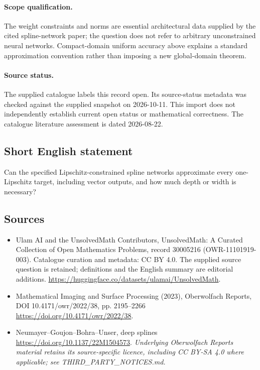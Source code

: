 \documentclass[11pt]{article}
\begin{document}
\paragraph{Scope qualification.}
The weight constraints and norms are essential architectural data supplied by the cited spline-network paper; the question does not refer to arbitrary unconstrained neural networks. Compact-domain uniform accuracy above explains a standard approximation convention rather than imposing a new global-domain theorem.
\paragraph{Source status.}
The supplied catalogue labels this record open. Its source-status metadata was checked against the supplied snapshot on 2026-10-11. This import does not independently establish current open status or mathematical correctness. The catalogue literature assessment is dated 2026-08-22.
\subsection{Short English statement}
Can the specified Lipschitz-constrained spline networks approximate every one-Lipschitz target, including vector outputs, and how much depth or width is necessary?
\subsection{Sources}
\begin{itemize}
\item[S1] Ulam AI and the UnsolvedMath Contributors, UnsolvedMath: A Curated Collection of Open Mathematics Problems, record 30005216 (OWR-11101919-003). Catalogue curation and metadata: CC BY 4.0. The supplied source question is retained; definitions and the English summary are editorial additions.
\url{https://huggingface.co/datasets/ulamai/UnsolvedMath}.
\item[S2] Mathematical Imaging and Surface Processing (2023), Oberwolfach Reports, DOI 10.4171/owr/2022/38, pp. 2195--2266
\url{https://doi.org/10.4171/owr/2022/38}.
\item[S3] Neumayer--Goujon--Bohra--Unser, deep splines
\url{https://doi.org/10.1137/22M1504573}.
\textit{Underlying Oberwolfach Reports material retains its source-specific licence, including CC BY-SA 4.0 where applicable; see THIRD\_PARTY\_NOTICES.md.}
\end{itemize}
\end{document}
